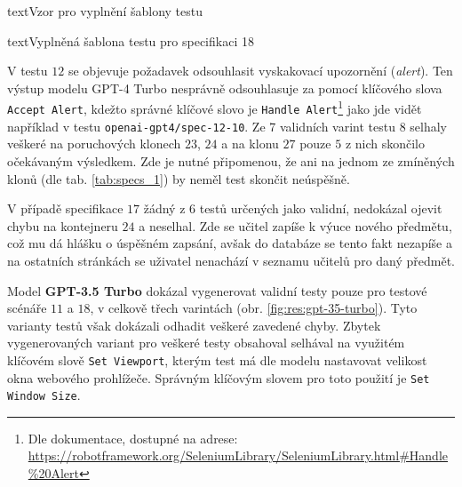 \documentclass[czech, ma, kiv, he, iso690numb, pdf, viewonly]{fasthesis}
\begin{document}
\begin{code}{text}{Vzor pro vyplnění šablony testu \label{lst:template}}
{\begin{code}{text}{Vyplněná šablona testu pro specifikaci 18 \label{lst:spec18}}
{            V testu \(12\) se objevuje požadavek odsouhlasit vyskakovací upozornění (\textit{alert}). Ten výstup modelu GPT-4 Turbo nesprávně odsouhlasuje za pomocí klíčového slova \verb|Accept Alert|, kdežto správné klíčové slovo je \verb|Handle Alert|\footnote{Dle dokumentace, dostupné na adrese: \url{https://robotframework.org/SeleniumLibrary/SeleniumLibrary.html#Handle\%20Alert}} jako jde vidět například v testu \verb|openai-gpt4/spec-12-10|. Ze 7 validních varint testu \(8\) selhaly veškeré na poruchových klonech \(23\), \(24\) a na klonu \(27\) pouze \(5\) z nich skončilo očekávaným výsledkem. Zde je nutné připomenou, že ani na jednom ze zmíněných klonů (dle tab. \ref{tab:specs_1}) by neměl test skončit neúspěšně.

            V případě specifikace \(17\) žádný z 6 testů určených jako validní, nedokázal ojevit chybu na kontejneru \(24\) a neselhal. Zde se učitel zapíše k výuce nového předmětu, což mu dá hlášku o úspěšném zapsání, avšak do databáze se tento fakt nezapíše a na ostatních stránkách se uživatel nenachází v seznamu učitelů pro daný předmět.

            Model \textbf{GPT-3.5 Turbo} dokázal vygenerovat validní testy pouze pro testové scénáře \(11\) a \(18\), v celkově třech varintách (obr. \ref{fig:res:gpt-35-turbo}). Tyto varianty testů však dokázali odhadit veškeré zavedené chyby. Zbytek vygenerovaných variant pro veškeré testy obsahoval selhával na využitém klíčovém slově \verb|Set Viewport|, kterým test má dle modelu nastavovat velikost okna webového prohlížeče. Správným klíčovým slovem pro toto použití je \verb|Set Window Size|.

}
\end{code}}
\end{code}
\end{document}
